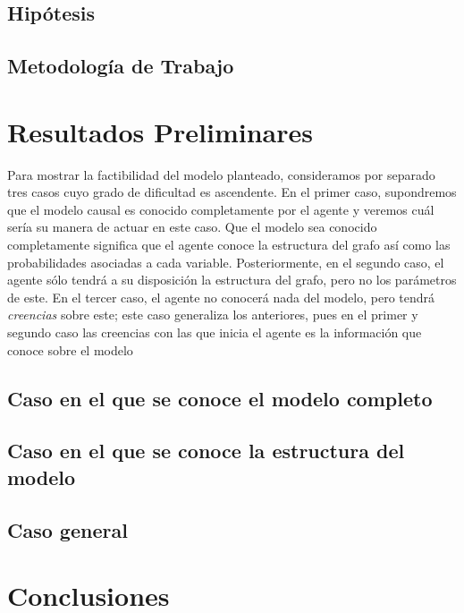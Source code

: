 \documentclass[11pt]{article}
\theoremstyle{plain}
\begin{document}
	\subsection{Hipótesis}
	\subsection{Metodología de Trabajo}

\section{Resultados Preliminares}
Para mostrar la factibilidad del modelo planteado, consideramos por separado tres casos cuyo grado de dificultad es ascendente. En el primer caso, supondremos que el modelo causal es conocido completamente por el agente y veremos cuál sería su manera de actuar en este caso. Que el modelo sea conocido completamente significa que el agente conoce la estructura del grafo así como las probabilidades asociadas a cada variable. Posteriormente, en el segundo caso, el agente sólo tendrá a su disposición la estructura del grafo, pero no los parámetros de este. En el tercer caso, el agente no conocerá nada del modelo, pero tendrá \textit{creencias} sobre este; este caso generaliza los anteriores, pues en el primer y segundo caso las creencias con las que inicia el agente es la información que conoce sobre el modelo
\subsection{Caso en el que se conoce el modelo completo}
\subsection{Caso en el que se conoce la estructura del modelo}
\subsection{Caso general}
\section{Conclusiones}



\end{document}
